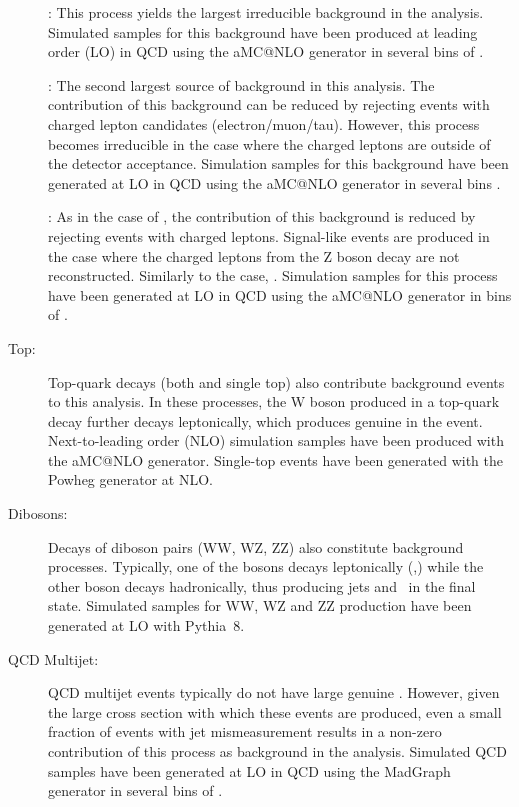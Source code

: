 \begin{description}
\item[\Zvvjets]: This process yields the largest irreducible background in the analysis. Simulated samples for this background have been produced at leading
order (LO) in QCD using the aMC@NLO generator in several bins of \Ht.

\item[\Wjets]: The second largest source of background in this analysis. The contribution of this background can be reduced by rejecting events with charged lepton candidates (electron/muon/tau). However, this process becomes irreducible in the case where the charged leptons are outside of the detector acceptance.
Simulation samples for this background have been generated at LO in QCD using the aMC@NLO generator in several bins \Ht.

\item[\Zlljets]: As in the case of \Wlv, the contribution of this background is reduced by rejecting events with charged leptons. Signal-like events are produced in the case where the charged leptons from the Z boson decay are not reconstructed. Similarly to the \Wjets case, .
Simulation samples for this process have been generated at LO in QCD using the aMC@NLO generator in bins of \Ht.

\item[Top:] Top-quark decays (both \ttbar and single top) also contribute background events to this analysis. In these processes, the W boson produced in a top-quark decay further decays leptonically, which produces genuine \ptmiss in the event. Next-to-leading order (NLO) \ttbar simulation samples have been produced with the aMC@NLO generator. Single-top events have been generated with the Powheg generator at NLO.

\item[Dibosons:] Decays of diboson pairs (WW, WZ, ZZ) also constitute background processes. Typically, one of the bosons decays leptonically (\Wlv,\Zvv) while the other boson decays hadronically, thus producing jets and \ptmiss~in the final state. Simulated samples for WW, WZ and ZZ production have been generated at LO with Pythia~8.

\item[QCD Multijet:] QCD multijet events typically do not have large genuine \ptmiss. However, given the large cross section with which these events are produced, even a small fraction of events with jet mismeasurement results in a non-zero contribution of this process as background in the analysis. Simulated QCD samples have been generated at LO in QCD using the MadGraph generator in several bins of \Ht.

\end{description}

